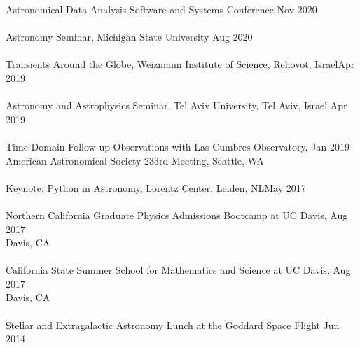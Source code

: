 \documentclass[10pt]{cv}
\begin{document}
\begin{llist}
\vspace{-0.1in}  
Astronomical Data Analysis Software and Systems Conference \hfill Nov 2020\\\vspace{-0.1in}  %
\\
Astronomy Seminar, Michigan State University \hfill Aug 2020 \\\vspace{-0.1in} %
\\
Transients Around the Globe, Weizmann Institute of Science, Rehovot, Israel\hfill Apr 2019\\ \vspace{-0.1in}  %
\\
Astronomy and Astrophysics Seminar, Tel Aviv University, Tel Aviv, Israel \hfill Apr 2019\\ \vspace{-0.1in}  %
\\
Time-Domain Follow-up Observations with Las Cumbres Observatory,   \hfill Jan 2019\\ 
American Astronomical Society 233rd Meeting, Seattle, WA \\ \vspace{-0.1in}  %
\\
Keynote; Python in Astronomy, Lorentz Center, Leiden, NL\hfill May 2017\\ \vspace{-0.1in}  %
\\
Northern California Graduate Physics Admissions Bootcamp at UC Davis, \hfill Aug 2017\\ 
Davis, CA\\ \vspace{-0.1in}  %
\\
California State Summer School for Mathematics and Science at UC Davis, \hfill Aug 2017\\ 
 Davis, CA \\ \vspace{-0.1in}  %
\\
Stellar and Extragalactic Astronomy Lunch at the Goddard Space Flight  \hfill Jun 2014\\  

\end{llist}
\end{document}

